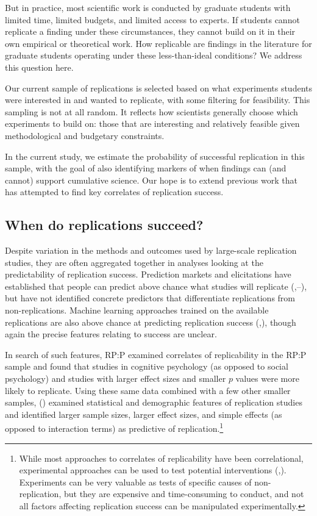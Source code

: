 \documentclass[
  english,
  a4paper,
]{article}
\begin{document}
But in practice, most scientific work is conducted by graduate students with limited time, limited budgets, and limited access to experts. If students cannot replicate a finding under these circumstances, they cannot build on it in their own empirical or theoretical work. How replicable are findings in the literature for graduate students operating under these less-than-ideal conditions? We address this question here.

Our current sample of replications is selected based on what experiments students were interested in and wanted to replicate, with some filtering for feasibility. This sampling is not at all random. It reflects how scientists generally choose which experiments to build on: those that are interesting and relatively feasible given methodological and budgetary constraints.

In the current study, we estimate the probability of successful replication in this sample, with the goal of also identifying markers of when findings can (and cannot) support cumulative science. Our hope is to extend previous work that has attempted to find key correlates of replication success.

\subsection{When do replications succeed?}\label{when-do-replications-succeed}

Despite variation in the methods and outcomes used by large-scale replication studies, they are often aggregated together in analyses looking at the predictability of replication success. Prediction markets and elicitations have established that people can predict above chance what studies will replicate (,--), but have not identified concrete predictors that differentiate replications from non-replications. Machine learning approaches trained on the available replications are also above chance at predicting replication success (,), though again the precise features relating to success are unclear.

In search of such features, RP:P examined correlates of replicability in the RP:P sample and found that studies in cognitive psychology (as opposed to social psychology) and studies with larger effect sizes and smaller \(p\) values were more likely to replicate. Using these same data combined with a few other smaller samples, () examined statistical and demographic features of replication studies and identified larger sample sizes, larger effect sizes, and simple effects (as opposed to interaction terms) as predictive of replication.\footnote{While most approaches to correlates of replicability have been correlational, experimental approaches can be used to test potential interventions (,). Experiments can be very valuable as tests of specific causes of non-replication, but they are expensive and time-consuming to conduct, and not all factors affecting replication success can be manipulated experimentally.}
\end{document}
